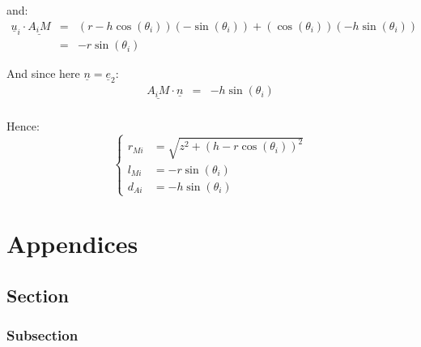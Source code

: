 \documentclass[a4paper,11pt,twoside,titlepage,openright]{book}
\numberwithin{equation}{section}
\newcommand{\ud}[1]{\underline{#1}}
\begin{document}
and:
$$
\begin{array}{lll}
    \ud{u}_i \cdot \ud{A_iM}
    & = & (r-h\cos(\theta_i))(-\sin(\theta_i))
    + (\cos(\theta_i))(-h\sin(\theta_i))\\
    & = & -r\sin(\theta_i)
\end{array}
$$

And since here $\ud{n} = \ud{e}_2$:
$$
\begin{array}{lll}
    \ud{A_iM} \cdot \ud{n}
    & = & - h\sin(\theta_i)\\
\end{array}
$$

Hence:
$$
\left\{
    \begin{array}{lll}
        r_{Mi} & = \sqrt{z^2 + (h - r\cos(\theta_i))^2}\\
        l_{Mi} & = -r\sin(\theta_i)\\
        d_{Ai} & = - h\sin(\theta_i)
    \end{array}
\right.
$$




\appendix
\chapter{Appendices}

\section{Section}
\subsection{Subsection}
\end{document}
